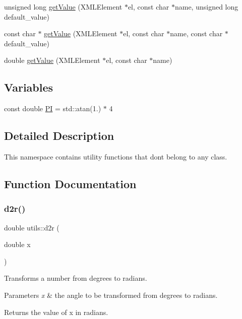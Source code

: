 \begin{DoxyCompactItemize}
\item 
unsigned long \mbox{\hyperlink{namespaceutils_aa81758518e26568880b7d74dc182c75d}{get\+Value}} (X\+M\+L\+Element $\ast$el, const char $\ast$name, unsigned long default\+\_\+value)
\item 
const char $\ast$ \mbox{\hyperlink{namespaceutils_ad69ebe54599ec891b3053cf9f5a1bd63}{get\+Value}} (X\+M\+L\+Element $\ast$el, const char $\ast$name, const char $\ast$default\+\_\+value)
\item 
double \mbox{\hyperlink{namespaceutils_a7347b1fde0bc9f313cd0a7051c33818a}{get\+Value}} (X\+M\+L\+Element $\ast$el, const char $\ast$name)
\end{DoxyCompactItemize}
\subsection*{Variables}
\begin{DoxyCompactItemize}
\item 
const double \mbox{\hyperlink{namespaceutils_a92ce7d254229929886551de7417e1912}{PI}} = std\+::atan(1.) $\ast$ 4
\end{DoxyCompactItemize}


\subsection{Detailed Description}
This namespace contains utility functions that don\textquotesingle{}t belong to any class. 

\subsection{Function Documentation}
\mbox{\label{namespaceutils_a1d747e438d856e6c46cd1fe558fe3821}} 
\subsubsection{\texorpdfstring{d2r()}{d2r()}}
{\footnotesize\ttfamily double utils\+::d2r (\begin{DoxyParamCaption}\item[{double}]{x }\end{DoxyParamCaption})\hspace{0.3cm}{\ttfamily [inline]}}

Transforms a number from degrees to radians. 
\begin{DoxyParams}{Parameters}
{\em x} & the angle to be transformed from degrees to radians. \\
\hline
\end{DoxyParams}
\begin{DoxyReturn}{Returns}
the value of x in radians. 
\end{DoxyReturn}
\mbox{\label{namespaceutils_acd746b43155fa3033001f28a91a71cec}} 
